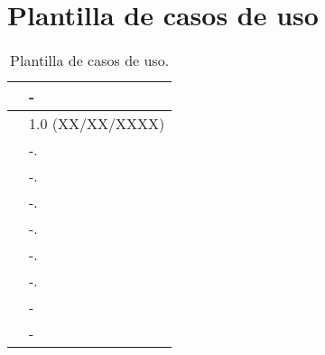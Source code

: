 \section{Plantilla de casos de uso}

\begin{table}[H]
\begin{center}
\begin{tabular}{|p{3cm}|p{10cm}|} \hline
\centering {\bf UC-XX} & -  \\ \hline\hline
\centering {\bf Versión} & 1.0 (XX/XX/XXXX) \\ \hline
\centering {\bf Dependencias} &  -. \\ \hline
\centering {\bf Descripción} &  -. \\ \hline
\centering {\bf Precondición} &  -. \\ \hline
\centering {\bf Secuencia normal} &  -. \\ \hline
\centering {\bf Postcondición} &  -. \\ \hline
\centering {\bf Excepciones} &  -. \\ \hline
\centering {\bf Importancia} & - \\ \hline
\centering {\bf Urgencia} & - \\ \hline
\end{tabular}
\caption{Plantilla de casos de uso.}
\label{enlaceUCX}
\end{center}
\end{table}
